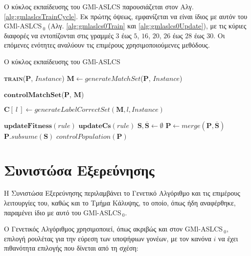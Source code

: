 Ο κύκλος εκπαίδευσης του GMl-ASLCS παρουσιάζεται στον Αλγ. \ref{alg:gmlaslcsTrainCycle}. Εκ πρώτης όψεως, εμφανίζεται να είναι ίδιος με αυτόν του GMl-ASLCS$_{\:0}$ (Αλγ. \ref{alg:gmlaslcs0Train} και \ref{alg:gmlaslcs0Update}), με τις κύριες διαφορές να εντοπίζονται στις γραμμές $3$ έως $5$, $16$, $20$, $26$ έως $28$ έως $30$. Οι επόμενες ενότητες αναλύουν τις επιμέρους χρησιμοποιούμενες μεθόδους.

\begin{algorithm} 
 \caption{Ο κύκλος εκπαίδευσης του GMl-ASLCS}
\label{alg:gmlaslcsTrainCycle}
 \begin{algorithmic}[1]
  \STATE \textbf{\textsc{train}}($\textbf{P}$, $Instance$)
	  	\STATE $\textbf{M} \gets generateMatchSet$($\textbf{P}$, $Instance$)
	  	
	  		\STATE $\textbf{controlMatchSet}$($\textbf{P}$, $\textbf{M}$)
	  	\ENDIF
	  		
			\STATE $\textbf{C}[\:l\:] \gets generateLabelCorrectSet(\textbf{M}, l, Instance)$
		\ENDFOR
		
			\STATE $\textbf{updateFitness}(rule)$
				\STATE $\textbf{updateCs}(rule)$
			\ENDIF
		\ENDFOR	
		\STATE $\textbf{S}, \overline{\textbf{S}} \gets \emptyset$ 
				\ENDIF
			\ELSE
			\ENDIF
		\ENDFOR
		\STATE $\textbf{P} \gets merge(\textbf{P},\overline{\textbf{S}})$
		\STATE $\textbf{P}.subsume(\textbf{S})$
			\STATE $controlPopulation(\textbf{P})$
		\ENDIF

 \end{algorithmic}
\end{algorithm}

\section{Συνιστώσα Εξερεύνησης}
Η Συνιστώσα Εξερεύνησης περιλαμβάνει το Γενετικό Αλγόριθμο και τις επιμέρους λειτουργίες του, καθώς και το Τμήμα Κάλυψης, το οποίο, όπως ήδη αναφέρθηκε, παραμένει ίδιο με αυτό του GMl-ASLCS$_{\:0}$. 

Ο Γενετικός Αλγόριθμος χρησιμοποιεί, όπως ακριβώς και στον GMl-ASLCS$_{\:0}$, επιλογή ρουλέτας για την εύρεση των υποψήφιων γονέων, με τον κανόνα $i$ να έχει πιθανότητα επιλογής που δίνεται από τη σχέση:


